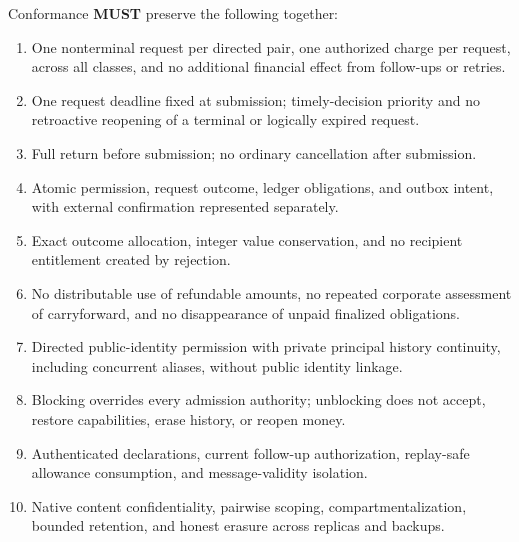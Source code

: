 \documentclass[11pt]{article}
\newcommand{\MUST}{\textbf{MUST}}
\begin{document}
Conformance \MUST{} preserve the following together:
\begin{enumerate}[leftmargin=2em,nosep]
\item One nonterminal request per directed pair, one authorized charge per request,
      across all classes, and no additional financial effect from follow-ups or retries.
\item One request deadline fixed at submission; timely-decision priority and no
      retroactive reopening of a terminal or logically expired request.
\item Full return before submission; no ordinary cancellation after submission.
\item Atomic permission, request outcome, ledger obligations, and outbox intent,
      with external confirmation represented separately.
\item Exact outcome allocation, integer value conservation, and no recipient
      entitlement created by rejection.
\item No distributable use of refundable amounts, no repeated corporate assessment
      of carryforward, and no disappearance of unpaid finalized obligations.
\item Directed public-identity permission with private principal history continuity,
      including concurrent aliases, without public identity linkage.
\item Blocking overrides every admission authority; unblocking does not accept,
      restore capabilities, erase history, or reopen money.
\item Authenticated declarations, current follow-up authorization, replay-safe
      allowance consumption, and message-validity isolation.
\item Native content confidentiality, pairwise scoping, compartmentalization,
      bounded retention, and honest erasure across replicas and backups.
\end{enumerate}
\end{document}

